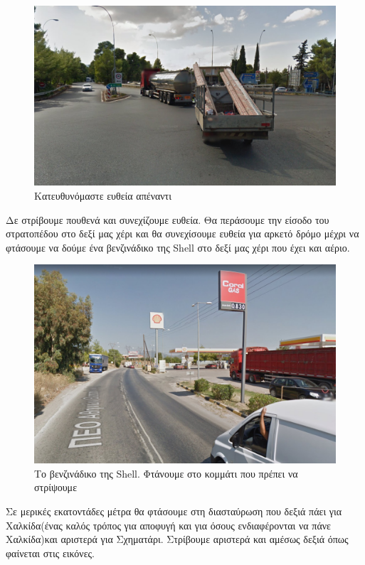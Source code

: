 \begin{figure}[hbp!]
	\centering
		\includegraphics[width=\textwidth]{images/athina-lamia/astefanos/astefanos4.PNG}
			\caption{Κατευθυνόμαστε ευθεία απέναντι}
\end{figure}
\break
Δε στρίβουμε πουθενά και συνεχίζουμε ευθεία. Θα περάσουμε την είσοδο του στρατοπέδου στο δεξί μας χέρι και θα συνεχίσουμε ευθεία για αρκετό δρόμο μέχρι να φτάσουμε να δούμε ένα βενζινάδικο της Shell στο δεξί μας χέρι που έχει και αέριο. 
\begin{figure}[hbp!]
	\centering
		\includegraphics[width=\textwidth]{images/athina-lamia/astefanos/astefanos5.PNG}
			\caption{Το βενζινάδικο της Shell. Φτάνουμε στο κομμάτι που πρέπει να στρίψουμε}
\end{figure}

\break
Σε μερικές εκατοντάδες μέτρα θα φτάσουμε στη διασταύρωση που δεξιά πάει για Χαλκίδα(ένας καλός τρόπος για αποφυγή και για όσους ενδιαφέρονται να πάνε Χαλκίδα)και αριστερά για Σχηματάρι. Στρίβουμε αριστερά και αμέσως δεξιά όπως φαίνεται στις εικόνες.

